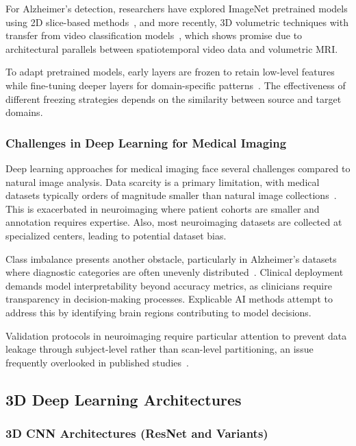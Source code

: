 \documentclass[12pt, a4paper]{article}
\begin{document}
For Alzheimer's detection, researchers have explored ImageNet pretrained models using 2D slice-based methods~\cite{hon2017towards,maqsood2019transfer}, and more recently, 3D volumetric techniques with transfer from video classification models~\cite{ebrahimi2020introducing}, which shows promise due to architectural parallels between spatiotemporal video data and volumetric MRI.

To adapt pretrained models, early layers are frozen to retain low-level features while fine-tuning deeper layers for domain-specific patterns~\cite{acharya2021alzheimer}. The effectiveness of different freezing strategies depends on the similarity between source and target domains.

\subsubsection{Challenges in Deep Learning for Medical Imaging}

Deep learning approaches for medical imaging face several challenges compared to natural image analysis. Data scarcity is a primary limitation, with medical datasets typically orders of magnitude smaller than natural image collections~\cite{litjens2017survey}. This is exacerbated in neuroimaging where patient cohorts are smaller and annotation requires expertise. Also, most neuroimaging datasets are collected at specialized centers, leading to potential dataset bias.

Class imbalance presents another obstacle, particularly in Alzheimer's datasets where diagnostic categories are often unevenly distributed~\cite{davatzikos2019machine}. Clinical deployment demands model interpretability beyond accuracy metrics, as clinicians require transparency in decision-making processes. Explicable AI methods attempt to address this by identifying brain regions contributing to model decisions.

Validation protocols in neuroimaging require particular attention to prevent data leakage through subject-level rather than scan-level partitioning, an issue frequently overlooked in published studies~\cite{litjens2017survey}.

\subsection{3D Deep Learning Architectures}

\subsubsection{3D CNN Architectures (ResNet and Variants)}
\end{document}
